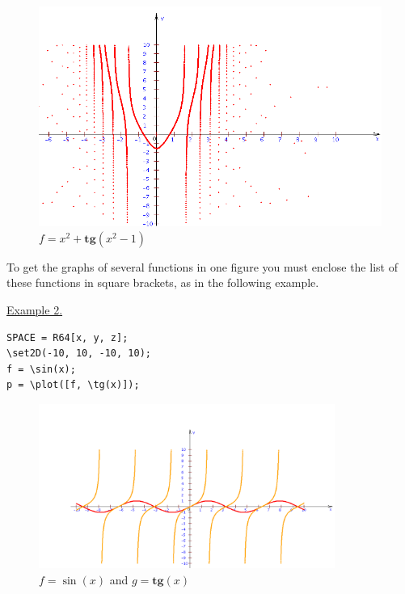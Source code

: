  


\begin{figure}[]
  \includegraphics[scale=0.45]{pictures/3_1}
  \caption{ $f=x^2+\mathbf{tg}(x^2-1)$}
  \label{301}
\end{figure}

\eject
To get the graphs of several functions in one figure you must enclose the list 
of these functions in square brackets, as in the following example.

\underline{Example 2. }


\begin{verbatim}
SPACE = R64[x, y, z];
\set2D(-10, 10, -10, 10);
f = \sin(x); 
p = \plot([f, \tg(x)]);
\end{verbatim}


\begin{figure}[!h]
  \includegraphics[width=274.6pt,height=152.38pt]{pictures/3_3}
  \caption{ $f = \sin(x)$ and $g = \mathbf{tg}(x)$}
  \label{3_3}
\end{figure}

